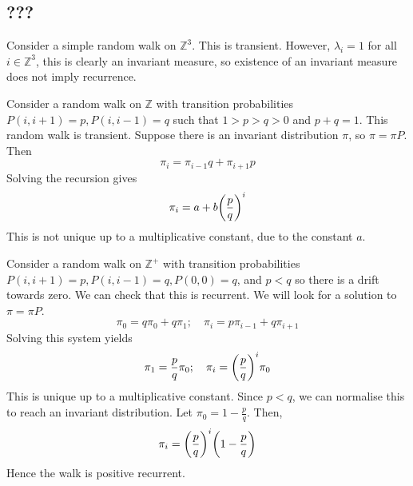 \subsection{???}
\begin{remark}
	Consider a simple random walk on \( \mathbb Z^3 \).
	This is transient.
	However, \( \lambda_i = 1 \) for all \( i \in \mathbb Z^3 \), this is clearly an invariant measure, so existence of an invariant measure does not imply recurrence.
\end{remark}
\begin{example}
	Consider a random walk on \( \mathbb Z \) with transition probabilities \( P(i, i+1) = p, P(i, i-1) = q \) such that \( 1 > p > q > 0 \) and \( p + q = 1 \).
	This random walk is transient.
	Suppose there is an invariant distribution \( \pi \), so \( \pi = \pi P \).
	Then
	\[
		\pi_i = \pi_{i-1} q + \pi_{i+1} p
	\]
	Solving the recursion gives
	\[
		\pi_i = a + b \qty(\frac{p}{q})^i
	\]
	This is not unique up to a multiplicative constant, due to the constant \( a \).
\end{example}
\begin{example}
	Consider a random walk on \( \mathbb Z^+ \) with transition probabilities \( P(i, i+1) = p, P(i, i-1) = q, P(0, 0) = q \), and \( p < q \) so there is a drift towards zero.
	We can check that this is recurrent.
	We will look for a solution to \( \pi = \pi P \).
	\[
		\pi_0 = q \pi_0 + q \pi_1;\quad \pi_i = p \pi_{i-1} + q \pi_{i+1}
	\]
	Solving this system yields
	\[
		\pi_1 = \frac{p}{q} \pi_0;\quad \pi_i = \qty(\frac{p}{q})^i \pi_0
	\]
	This is unique up to a multiplicative constant.
	Since \( p < q \), we can normalise this to reach an invariant distribution.
	Let \( \pi_0 = 1 - \frac{p}{q} \).
	Then,
	\[
		\pi_i = \qty(\frac{p}{q})^i \qty(1 - \frac{p}{q})
	\]
	Hence the walk is positive recurrent.
\end{example}

